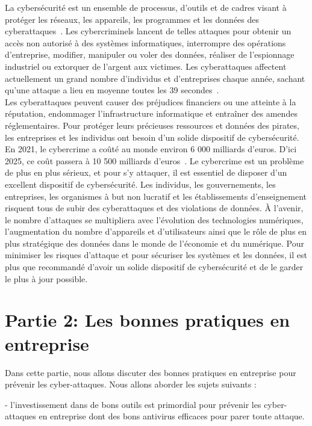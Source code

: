 \documentclass[a4paper,11pt]{article}
\begin{document}
La cybersécurité est un ensemble de processus, d'outils et de cadres visant à protéger les réseaux, les appareils, les programmes et les données des cyberattaques~\cite{article12}.
Les cybercriminels lancent de telles attaques pour obtenir un accès non autorisé à des systèmes informatiques, interrompre des opérations d'entreprise, modif{\null}ier, manipuler ou voler des données, réaliser de l'espionnage industriel ou extorquer de l'argent aux victimes. Les cyberattaques af{\null}fectent actuellement un grand nombre d'individus et d'entreprises chaque année, sachant qu'une attaque a lieu en moyenne toutes les 39 secondes~\cite{article1}.
\\Les cyberattaques peuvent causer des préjudices f{\null}inanciers ou une atteinte à la réputation, endommager l'infrastructure informatique et entraîner des amendes réglementaires.
Pour protéger leurs précieuses ressources et données des pirates, les entreprises et les individus ont besoin d'un solide dispositif de cybersécurité. En 2021, le cybercrime a coûté au monde environ 6 000 milliards d'euros. D'ici 2025, ce coût passera à 10 500 milliards d'euros~\cite{article1}.
Le cybercrime est un problème de plus en plus sérieux, et pour s'y attaquer, il est essentiel de disposer d'un excellent dispositif de cybersécurité. Les individus, les gouvernements, les entreprises, les organismes à but non lucratif et les établissements d'enseignement risquent tous de subir des cyberattaques et des violations de données.
À l'avenir, le nombre d'attaques se multipliera avec l'évolution des technologies numériques, l'augmentation du nombre d'appareils et d'utilisateurs ainsi que le rôle de plus en plus stratégique des données dans le monde de l'économie et du numérique.
Pour minimiser les risques d'attaque et pour sécuriser les systèmes et les données, il est plus que recommandé d'avoir un solide dispositif de cybersécurité et de le garder le plus à jour possible.


\section{Partie 2: Les bonnes pratiques en entreprise}

Dans cette partie, nous allons discuter des bonnes pratiques en entreprise pour prévenir les cyber-attaques. Nous allons aborder les sujets suivants :

  - l’investissement dans de bons outils est primordial pour prévenir les cyber-attaques en entreprise dont des bons antivirus efficaces pour parer toute attaque.
\end{document}
